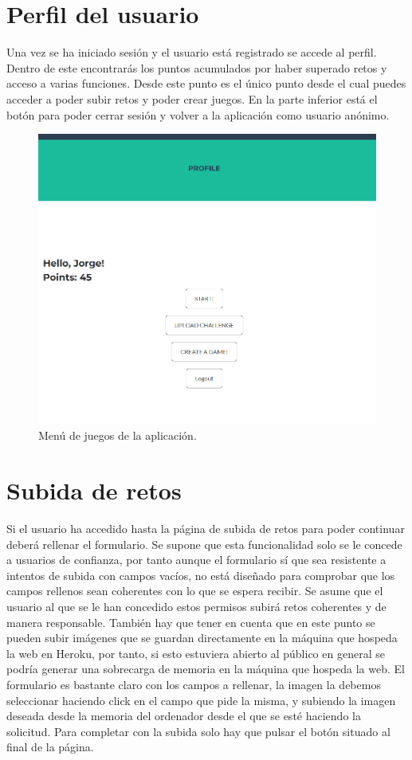 \documentclass[a4paper, 12pt]{book}
\begin{document}
\section{Perfil del usuario}
Una vez se ha iniciado sesión y el usuario está registrado se accede al perfil. Dentro de este encontrarás los puntos acumulados por haber superado retos y acceso a varias funciones. Desde este punto es el único punto desde el cual puedes acceder a poder subir retos y poder crear juegos. En la parte inferior está el botón para poder cerrar sesión y volver a la aplicación como usuario anónimo. 
\begin{figure}
	\centering
	\includegraphics[width=16cm, keepaspectratio]{img/profile_html.png}
	\caption{Menú de juegos de la aplicación.}\label{fig:profile}
\end{figure}

\section{Subida de retos}
Si el usuario ha accedido hasta la página de subida de retos para poder continuar deberá rellenar el formulario. Se supone que esta funcionalidad solo se le concede a usuarios de confianza, por tanto aunque el formulario sí que sea resistente a intentos de subida con campos vacíos, no está diseñado para comprobar que los campos rellenos sean coherentes con lo que se espera recibir. Se asume que el usuario al que se le han concedido estos permisos subirá retos coherentes y de manera responsable. También hay que tener en cuenta que en este punto se pueden subir imágenes que se guardan directamente en la máquina que hospeda la web en Heroku, por tanto, si esto estuviera abierto al público en general se podría generar una sobrecarga de memoria en la máquina que hospeda la web.
El formulario es bastante claro con los campos a rellenar, la imagen la debemos seleccionar haciendo click en el campo que pide la misma, y subiendo la imagen deseada desde la memoria del ordenador desde el que se esté haciendo la solicitud. 
Para completar con la subida solo hay que pulsar el botón situado al final de la página. 
\end{document}
